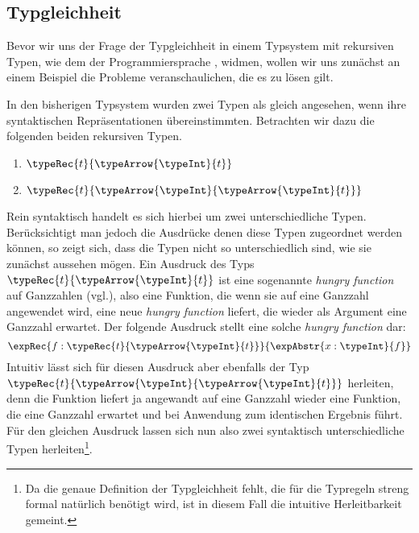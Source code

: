 
\subsection{Typgleichheit}

Bevor wir uns der Frage der Typgleichheit in einem Typsystem mit rekursiven Typen, wie dem der
Programmiersprache \Lort, widmen, wollen wir uns zun\"achst an einem Beispiel die Probleme
veranschaulichen, die es zu l\"osen gilt.

\begin{beispiel}
  In den bisherigen Typsystem wurden zwei Typen als gleich angesehen, wenn ihre syntaktischen Repr\"asentationen
  \"ubereinstimmten. Betrachten wir dazu die folgenden beiden rekursiven Typen.
  \begin{enumerate}
    \item $\typeRec{t}{\typeArrow{\typeInt}{t}}$
    \item $\typeRec{t}{\typeArrow{\typeInt}{\typeArrow{\typeInt}{t}}}$
  \end{enumerate}
  Rein syntaktisch handelt es sich hierbei um zwei unterschiedliche Typen. Ber\"ucksichtigt man jedoch die
  Ausdr\"ucke denen diese Typen zugeordnet werden k\"onnen, so zeigt sich, dass die Typen nicht so unterschiedlich
  sind, wie sie zun\"achst aussehen m\"ogen. Ein Ausdruck des Typs $\typeRec{t}{\typeArrow{\typeInt}{t}}$
  ist eine sogenannte {\em hungry function} auf Ganzzahlen (vgl.\cite[S.300]{Pierce02}), also eine Funktion, die
  wenn sie auf eine Ganzzahl angewendet wird, eine neue {\em hungry function} liefert, die wieder als Argument
  eine Ganzzahl erwartet. Der folgende Ausdruck stellt eine solche {\em hungry function} dar:
  \[
    \expRec{f:\typeRec{t}{\typeArrow{\typeInt}{t}}}{\expAbstr{x:\typeInt}{f}}
  \]
  Intuitiv l\"asst sich f\"ur diesen Ausdruck aber ebenfalls der Typ
  $\typeRec{t}{\typeArrow{\typeInt}{\typeArrow{\typeInt}{t}}}$ herleiten, denn die Funktion liefert ja angewandt
  auf eine Ganzzahl wieder eine Funktion, die eine Ganzzahl erwartet und bei Anwendung zum identischen Ergebnis
  f\"uhrt. F\"ur den gleichen Ausdruck lassen
  sich nun also zwei syntaktisch unterschiedliche Typen herleiten\footnote{Da die genaue Definition der Typgleichheit
  fehlt, die f\"ur die Typregeln streng formal nat\"urlich ben\"otigt wird, ist in diesem Fall die intuitive
  Herleitbarkeit gemeint.}.
\end{beispiel}

